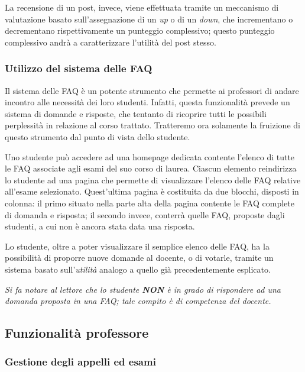\documentclass [a4paper,11pt]{book}
\begin{document}
La recensione di un post, invece, viene effettuata tramite un meccanismo di valutazione basato sull'assegnazione di un \emph{up} o di un \emph{down}, che incrementano o decrementano rispettivamente un punteggio complessivo; questo punteggio complessivo andrà a caratterizzare l'utilità del post stesso.

\medskip

\subsubsection{Utilizzo del sistema delle FAQ}

Il sistema delle FAQ è un potente strumento che permette ai professori di andare incontro alle necessità dei loro studenti. Infatti, questa funzionalità prevede un sistema di domande e risposte, che tentanto di ricoprire tutti le possibili perplessità in relazione al corso trattato. Tratteremo ora solamente la fruizione di questo strumento dal punto di vista dello studente.

Uno studente può accedere ad una homepage dedicata contente l'elenco di tutte le FAQ associate agli esami del suo corso di laurea. Ciascun elemento reindirizza lo studente ad una pagina che permette di visualizzare l'elenco delle FAQ relative all'esame selezionato. Quest'ultima pagina è costituita da due blocchi, disposti in colonna: il primo situato nella parte alta della pagina contente le FAQ complete di domanda e risposta; il secondo invece, conterrà quelle FAQ, proposte dagli studenti, a cui non è ancora stata data una risposta.

Lo studente, oltre a poter visualizzare il semplice elenco delle FAQ, ha la possibilità di proporre nuove domande al docente, o di votarle, tramite un sistema basato sull'\emph{utilità} analogo a quello già precedentemente esplicato. 

\emph{Si fa notare al lettore che lo studente \textbf{NON} è in grado di rispondere ad una domanda proposta in una FAQ; tale compito è di competenza del docente.}

\medskip

\subsection{Funzionalità professore}

\subsubsection{Gestione degli appelli ed esami}
\end{document}
